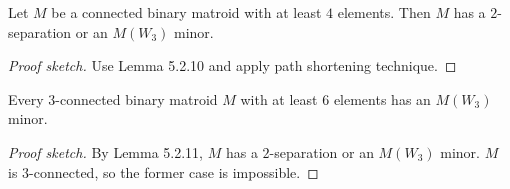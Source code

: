 \begin{lemma}[5.2.11]
  \label{lem:5.2.11}
  Let $M$ be a connected binary matroid with at least $4$ elements. Then $M$ has a $2$-separation or an $M(W_3)$ minor.
\end{lemma}

\begin{proof}[Proof sketch]
  Use Lemma 5.2.10 and apply path shortening technique.
\end{proof}

\begin{corollary}[5.2.15]
  \label{cor:5.2.15}
  Every $3$-connected binary matroid $M$ with at least $6$ elements has an $M(W_3)$ minor.
\end{corollary}

\begin{proof}[Proof sketch]
  By Lemma 5.2.11, $M$ has a $2$-separation or an $M(W_{3})$ minor. $M$ is $3$-connected, so the former case is impossible.
\end{proof}
